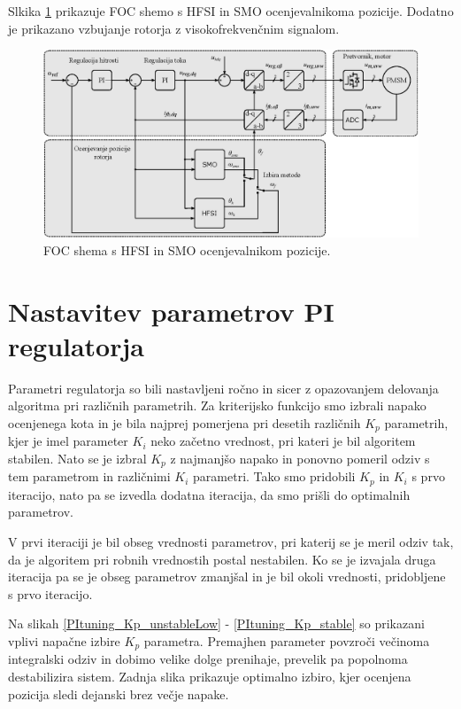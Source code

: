 \documentclass[a4paper,twoside,openright,12pt,slovene]{book}
\begin{document}
Slkika \ref{FOC} prikazuje FOC shemo s HFSI in SMO ocenjevalnikoma pozicije. Dodatno je prikazano vzbujanje rotorja z visokofrekvenčnim signalom.

\begin{figure}[!htbp]
    \centering
    \includegraphics[width=0.95\columnwidth]{Slike/Inkscape/FOC.eps}
    \caption{\label{FOC} FOC shema s HFSI in SMO ocenjevalnikom pozicije. }
\end{figure}

\newpage
\section{Nastavitev parametrov PI regulatorja}

Parametri regulatorja so bili nastavljeni ročno in sicer z opazovanjem delovanja algoritma pri različnih parametrih. Za kriterijsko funkcijo smo izbrali napako ocenjenega kota in je bila najprej
pomerjena pri desetih različnih $K_p$ parametrih, kjer je imel parameter $K_i$ neko začetno vrednost, pri kateri je bil algoritem stabilen. Nato se je izbral $K_p$ z najmanjšo napako in ponovno pomeril
odziv s tem parametrom in različnimi $K_i$ parametri. Tako smo pridobili $K_p$ in $K_i$ s prvo iteracijo, nato pa se izvedla dodatna iteracija, da smo prišli do optimalnih parametrov. 

V prvi iteraciji je bil obseg vrednosti parametrov, pri katerij se je meril odziv tak, da je algoritem pri robnih vrednostih postal nestabilen. Ko se je izvajala druga iteracija pa se je obseg
parametrov zmanjšal in je bil okoli vrednosti, pridobljene s prvo iteracijo.

Na slikah \ref{PItuning_Kp_unstableLow} - \ref{PItuning_Kp_stable} so prikazani vplivi napačne izbire $K_p$ parametra. Premajhen parameter povzroči večinoma integralski odziv in dobimo velike dolge
prenihaje, prevelik pa popolnoma destabilizira sistem. Zadnja slika prikazuje optimalno izbiro, kjer ocenjena pozicija sledi dejanski brez večje napake.
\end{document}
